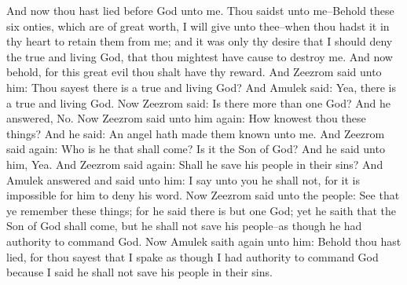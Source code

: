 And now thou hast lied before God unto me. Thou saidst unto me--Behold these six onties, which are of great worth, I will give unto thee--when thou hadst it in thy heart to retain them from me; and it was only thy desire that I should deny the true and living God, that thou mightest have cause to destroy me. And now behold, for this great evil thou shalt have thy reward.
\bverse \iffalse And Zeezrom said unto him: Thou sayest there is a true and living God? \fi
And Zeezrom said unto him: Thou sayest there is a true and living God?
\bverse \iffalse And Amulek said: Yea, there is a true and living God. \fi
And Amulek said: Yea, there is a true and living God.
\bverse \iffalse Now Zeezrom said: Is there more than one God? \fi
Now Zeezrom said: Is there more than one God?
\bverse \iffalse And he answered, No. \fi
And he answered, No.
\bverse \iffalse Now Zeezrom said unto him again: How knowest thou these things? \fi
Now Zeezrom said unto him again: How knowest thou these things?
\bverse \iffalse And he said: An angel hath made them known unto me. \fi
And he said: An angel hath made them known unto me.
\bverse \iffalse And Zeezrom said again: Who is he that shall come? Is it the Son of God? \fi
And Zeezrom said again: Who is he that shall come? Is it the Son of God?
\bverse \iffalse And he said unto him, Yea. \fi
And he said unto him, Yea.
\bverse \iffalse And Zeezrom said again: Shall he save his people in their sins? And Amulek answered and said unto him: I say unto you he shall not, for it is impossible for him to deny his word. \fi
And Zeezrom said again: Shall he save his people in their sins? And Amulek answered and said unto him: I say unto you he shall not, for it is impossible for him to deny his word.
\bverse \iffalse Now Zeezrom said unto the people: See that ye remember these things; for he said there is but one God; yet he saith that the Son of God shall come, but he shall not save his people--as though he had authority to command God. \fi
Now Zeezrom said unto the people: See that ye remember these things; for he said there is but one God; yet he saith that the Son of God shall come, but he shall not save his people--as though he had authority to command God.
\bverse \iffalse Now Amulek saith again unto him: Behold thou hast lied, for thou sayest that I spake as though I had authority to command God because I said he shall not save his people in their sins. \fi
Now Amulek saith again unto him: Behold thou hast lied, for thou sayest that I spake as though I had authority to command God because I said he shall not save his people in their sins.
